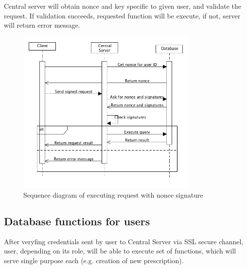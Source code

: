 Central server will obtain nonce and key specific to given user, and validate the request. If validation succeeds, requested function will be execute, if not, server will return error message.
\clearpage
\begin{figure}[h]
\centering
\includegraphics[width=0.8\textwidth]{database/nonce.png}
\caption{Sequence diagram of executing request with nonce signature}
\end{figure} 

\subsection{Database functions for users}
After veryfing credentials sent by user to Central Server via SSL secure channel, user, depending on its role, will be able to execute set of functions, which will serve single purpose each (e.g. creation of new prescription).

